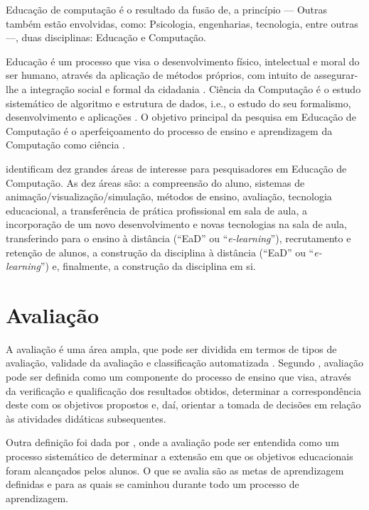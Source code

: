 Educação de computação é o resultado da fusão de, a princípio --- Outras também estão envolvidas, como: Psicologia, engenharias, tecnologia, entre outras ---, duas disciplinas: Educação e Computação. 

Educação é um processo que visa o desenvolvimento físico, intelectual e moral do ser humano, através da aplicação de métodos próprios, com intuito de assegurar-lhe a integração social e formal da cidadania \cite{weiszflog1999michaelis}. Ciência da Computação é o estudo sistemático de algoritmo e estrutura de dados, i.e., o estudo do seu formalismo, desenvolvimento e aplicações \cite{gibbs1986model}. O objetivo principal da pesquisa em Educação de Computação é o aperfeiçoamento do processo de ensino e aprendizagem da Computação como ciência \cite{holmboe2001research}.

 identificam dez grandes áreas de interesse para pesquisadores em Educação de Computação. As dez áreas são: a compreensão do aluno, sistemas de animação/visualização/simulação, métodos de ensino, avaliação, tecnologia educacional, a transferência de prática profissional em sala de aula, a incorporação de um novo desenvolvimento e novas tecnologias na sala de aula, transferindo para o ensino à distância (“EaD” ou “\textit{e-learning}”), recrutamento e retenção de alunos, a construção da disciplina à distância (“EaD” ou “\textit{e-learning}”) e, finalmente, a construção da disciplina em si. 


\section{Avaliação}
\label{sec:AVA}
A avaliação é uma área ampla, que pode ser dividida em termos de tipos de avaliação, validade da avaliação e classificação automatizada \cite{fincher2005mapping}. Segundo , avaliação pode ser definida como um componente do processo de ensino que visa, através da verificação e qualificação dos resultados obtidos, determinar a correspondência  deste com os objetivos propostos e, daí, orientar a tomada de decisões em relação às atividades didáticas subsequentes.

Outra definição foi dada por , onde a avaliação pode ser entendida como um processo sistemático de determinar a extensão em que os objetivos educacionais foram alcançados pelos alunos. O que se avalia são as metas de aprendizagem definidas e para as quais se caminhou durante todo um processo de aprendizagem.

